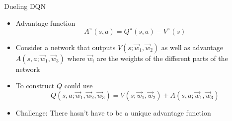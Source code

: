 \begin{frame}[c]{Dueling DQN }
	
	\begin{itemize}
	\item Advantage function 
	$$A^\pi (s,a) = Q^\pi(s,a) - V^\pi(s) $$
	\item Consider a network that outputs $V(s; \vec{w}_1, \vec{w}_2)$ as well as advantage $A(s,a; \vec{w}_1, \vec{w}_3)$ where $\vec{w}_i$ are the weights of the different parts of the network
	\item To construct $Q$ could use $$Q(s,a;\vec{w}_1, \vec{w}_2, \vec{w}_3) = V(s;\vec{w}_1, \vec{w}_2) + A(s,a;\vec{w}_1, \vec{w}_3)$$
	\bigskip
	\pause
	\item Challenge: There hasn't have to be a unique advantage function

	\end{itemize}
	
\end{frame}

